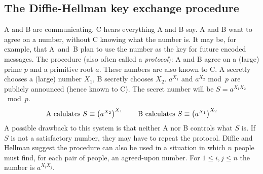\subsection{The Diffie-Hellman key exchange procedure}
A and B are communicating.  C hears everything A and B say.
A and B want to agree on a number, without C knowing what the 
number is. It may be, for example, that A~and~B plan to use the
number as the key for future encoded messages.
The procedure (also often called a {\it protocol\/}):
\pq A and B agree on a (large) prime $p$ and a primitive root $a$.
These numbers are also known to C.  A secretly chooses a (large)
number $X_1$, B secretly chooses $X_2$.  $a^{X_1}$ and $a^{X_2}$
 mod~$p$ are publicly announced (hence known to C).  The secret number
will be $S=a^{X_1X_2}$~mod~$p$.
$$\hbox{A calulates }S\equiv\left(a^{X_2}\right)^{X_1}\qquad
\hbox{B calculates }S\equiv\left(a^{X_1}\right)^{X_2}$$
A possible drawback to this system is that neither A nor B controls
what $S$ is.  If $S$ is not a satisfactory number, they may have
to repeat the protocol.
\pq Diffie and Hellman suggest the procedure can also be used in
a situation in which $n$ people must find, for each pair of people,
an agreed-upon number.  For $1\le i,j\le n$ the number is $a^{X_iX_j}$.
